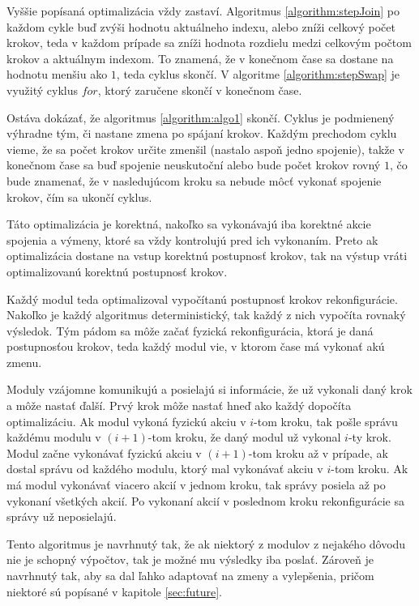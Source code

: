 \documentclass[
  digital, %
  oneside, %
  table,   %
  lof,     %
  nolot,     %
]{fithesis3}
\begin{document}
Vyššie popísaná optimalizácia vždy zastaví. Algoritmus \ref{algorithm:stepJoin} po každom cykle buď zvýši hodnotu aktuálneho indexu, alebo zníži celkový počet krokov, teda v každom prípade sa zníži hodnota rozdielu medzi celkovým počtom krokov a aktuálnym indexom. To znamená, že v konečnom čase sa dostane na hodnotu menšiu ako $1$, teda cyklus skončí. V algoritme \ref{algorithm:stepSwap} je využitý cyklus $for$, ktorý zaručene skončí v konečnom čase. 

Ostáva dokázať, že algoritmus \ref{algorithm:algo1} skončí. Cyklus je podmienený výhradne tým, či nastane zmena po spájaní krokov. Každým prechodom cyklu vieme, že sa počet krokov určite zmenšil (nastalo aspoň jedno spojenie), takže v konečnom čase sa buď spojenie neuskutoční alebo bude počet krokov rovný $1$, čo bude znamenať, že v nasledujúcom kroku sa nebude môcť vykonať spojenie krokov, čím sa ukončí cyklus. 

Táto optimalizácia je korektná, nakoľko sa vykonávajú iba korektné akcie spojenia a výmeny, ktoré sa vždy kontrolujú pred ich vykonaním. Preto ak optimalizácia dostane na vstup korektnú postupnosť krokov, tak na výstup vráti optimalizovanú korektnú postupnosť krokov. 

Každý modul teda optimalizoval vypočítanú postupnosť krokov rekonfigurácie. Nakoľko je každý algoritmus deterministický, tak každý z nich vypočíta rovnaký výsledok. Tým pádom sa môže začať fyzická rekonfigurácia, ktorá je daná postupnosťou krokov, teda každý modul vie, v ktorom čase má vykonať akú zmenu. 

Moduly vzájomne komunikujú a posielajú si informácie, že už vykonali daný krok a môže nastať ďalší. Prvý krok môže nastať hneď ako každý dopočíta optimalizáciu. Ak modul vykoná fyzickú akciu v $i$-tom kroku, tak pošle správu každému modulu v $(i + 1)$-tom kroku, že daný modul už vykonal $i$-ty krok. Modul začne vykonávať fyzickú akciu v $(i + 1)$-tom kroku až v prípade, ak dostal správu od každého modulu, ktorý mal vykonávať akciu v $i$-tom kroku. Ak má modul vykonávať viacero akcií v jednom kroku, tak správy posiela až po vykonaní všetkých akcií. Po vykonaní akcií v poslednom kroku rekonfigurácie sa správy už neposielajú. 

Tento algoritmus je navrhnutý tak, že ak niektorý z modulov z nejakého dôvodu nie je schopný výpočtov, tak je možné mu výsledky iba poslať. Zároveň je navrhnutý tak, aby sa dal ľahko adaptovať na zmeny a vylepšenia, pričom niektoré sú popísané v kapitole \ref{sec:future}.  
\end{document}
